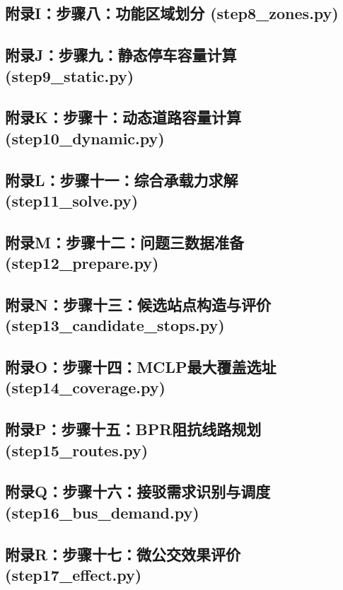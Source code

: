 \documentclass[UTF8,zihao=-4,a4paper]{ctexart}
\numberwithin{table}{section}
\numberwithin{figure}{section}
\numberwithin{equation}{section}
\begin{document}
\subsection*{附录I：步骤八：功能区域划分 (step8\_zones.py)}


\subsection*{附录J：步骤九：静态停车容量计算 (step9\_static.py)}


\subsection*{附录K：步骤十：动态道路容量计算 (step10\_dynamic.py)}


\subsection*{附录L：步骤十一：综合承载力求解 (step11\_solve.py)}


\subsection*{附录M：步骤十二：问题三数据准备 (step12\_prepare.py)}


\subsection*{附录N：步骤十三：候选站点构造与评价 (step13\_candidate\_stops.py)}


\subsection*{附录O：步骤十四：MCLP最大覆盖选址 (step14\_coverage.py)}


\subsection*{附录P：步骤十五：BPR阻抗线路规划 (step15\_routes.py)}


\subsection*{附录Q：步骤十六：接驳需求识别与调度 (step16\_bus\_demand.py)}


\subsection*{附录R：步骤十七：微公交效果评价 (step17\_effect.py)}

\end{document}
